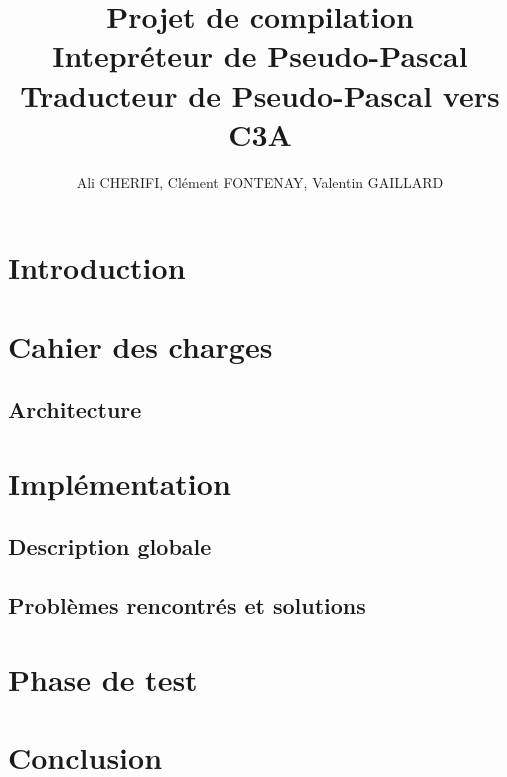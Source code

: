 \documentclass[10pt,a4paper]{article}
\author{Ali CHERIFI, Clément FONTENAY, Valentin GAILLARD}
\title{Projet de compilation\\Intepréteur de Pseudo-Pascal \\Traducteur de Pseudo-Pascal vers C3A}
\begin{document}
\maketitle
\newpage
\tableofcontents
\newpage
\section{Introduction}

\section{Cahier des charges}


\subsection{Architecture}


\section{Implémentation}
\subsection{Description globale}
\subsection{Problèmes rencontrés et solutions}

\section{Phase de test}


\newpage
\section{Conclusion}
\end{document}
